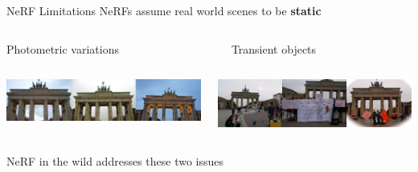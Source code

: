 \documentclass[aspectratio=1610]{beamer}
\begin{document}
\begin{frame}{NeRF Limitations}
    NeRFs assume real world scenes to be \textbf{static}
    \vspace{1.5cm}
    \begin{columns}[t]
        \begin{column}{.4\textwidth}
            Photometric variations\\
        \end{column}
        \begin{column}{.4\textwidth}
            Transient objects\\
        \end{column}
    \end{columns}
    \begin{columns}
        \begin{column}{.4\textwidth}
            \begin{center}
                \includegraphics[width=\textwidth]{issues-var.png}
            \end{center}
        \end{column}
        \begin{column}{.4\textwidth}
            \begin{center}
                \includegraphics[width=\textwidth]{issues-transient.png}
            \end{center}
        \end{column}
    \end{columns}
    \vspace{1.5cm}
    \pause
    NeRF in the wild addresses these two issues
\end{frame}
\end{document}
